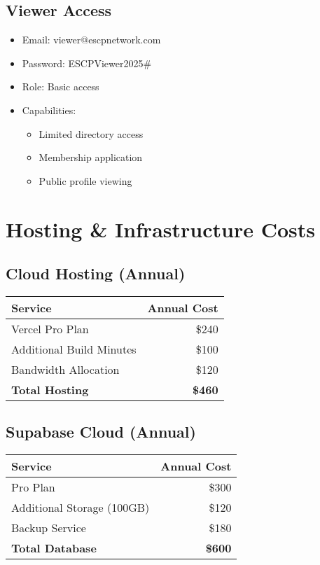 \documentclass[11pt,a4paper]{article}
\begin{document}
\subsection{Viewer Access}
\begin{tcolorbox}[colback=white,colframe=primaryBlue!20,title=Viewer Credentials]
\begin{itemize}[leftmargin=*]
    \item Email: viewer@escpnetwork.com
    \item Password: ESCPViewer2025\#
    \item Role: Basic access
    \item Capabilities:
    \begin{itemize}
        \item Limited directory access
        \item Membership application
        \item Public profile viewing
    \end{itemize}
\end{itemize}
\end{tcolorbox}

\section{Hosting \& Infrastructure Costs}

\subsection{Cloud Hosting (Annual)}
\begin{tcolorbox}[colback=white,colframe=secondaryGreen!20]
\begin{tabular}{lr}
\toprule
\textbf{Service} & \textbf{Annual Cost} \\
\midrule
Vercel Pro Plan & \$240 \\
Additional Build Minutes & \$100 \\
Bandwidth Allocation & \$120 \\
\midrule
\textbf{Total Hosting} & \textbf{\$460} \\
\bottomrule
\end{tabular}
\end{tcolorbox}

\subsection{Supabase Cloud (Annual)}
\begin{tcolorbox}[colback=white,colframe=secondaryGreen!20]
\begin{tabular}{lr}
\toprule
\textbf{Service} & \textbf{Annual Cost} \\
\midrule
Pro Plan & \$300 \\
Additional Storage (100GB) & \$120 \\
Backup Service & \$180 \\
\midrule
\textbf{Total Database} & \textbf{\$600} \\
\bottomrule
\end{tabular}
\end{tcolorbox}
\end{document}
